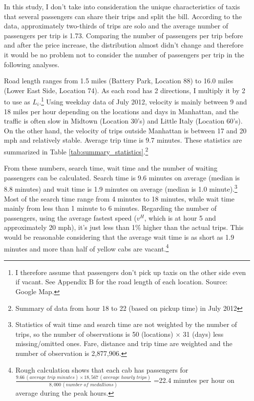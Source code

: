 In this study, I don't take into consideration the unique characteristics of taxis that several passengers can share their trips and split the bill. According to the data, approximately two-thirds of trips are solo and the average number of passengers per trip is 1.73. Comparing the number of passengers per trip before and after the price increase, the distribution almost didn't change and therefore it would be no problem not to consider the number of passengers per trip in the following analyses. 

\indent Road length ranges from 1.5 miles (Battery Park, Location 88) to 16.0 miles (Lower East Side, Location 74). As each road has 2 directions, I multiply it by 2 to use as $L_i$.\footnote{I therefore assume that passengers don't pick up taxis on the other side even if vacant. See Appendix B for the road length of each location. Source: Google Map.} Using weekday data of July 2012, velocity is mainly between 9 and 18 miles per hour depending on the locations and days in Manhattan, and the traffic is often slow in Midtown (Location 30's) and Little Italy (Location 60's). On the other hand, the velocity of trips outside Manhattan is between 17 and 20 mph and relatively stable. Average trip time is 9.7 minutes. These statistics are summarized in Table \ref{tab:summary_statistics}.\footnote{Summary of data from hour 18 to 22 (based on pickup time) in July 2012}



\indent From these numbers, search time, wait time and the number of waiting passengers can be calculated. Search time is 9.6 minutes on average (median is 8.8 minutes) and wait time is 1.9 minutes on average (median is 1.0 minute).\footnote{Statistics of wait time and search time are not weighted by the number of trips, so the number of observations is 50 (locations) $\times$ 31 (days) less missing/omitted ones. Fare, distance and trip time are weighted and the number of observation is 2,877,906.} Most of the search time range from 4 minutes to 18 minutes, while wait time mainly from less than 1 minute to 6 minutes. Regarding the number of passengers, using the average fastest speed ($v^H$, which is at hour 5 and approximately 20 mph), it's just less than 1\% higher than the actual trips. This would be reasonable considering that the average wait time is as short as 1.9 minutes and more than half of yellow cabs are vacant.\footnote{Rough calculation shows that each cab has passengers for $\frac{9.66 \, (average　\,\, trip　\,\, minutes) \times 18,567 \, (average　\,\, hourly　\,\, trips) }{8,000 \,(number \,\, of \,\, medallions)}$ =22.4 minutes per hour on average during the peak hours.}

